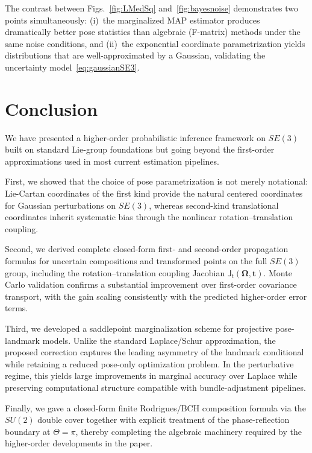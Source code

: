 \documentclass[journal]{IEEEtran}
\newcommand{\bfOmega}{\boldsymbol{\Omega}}
\begin{document}
The contrast between Figs.~\ref{fig:LMedSq} 
and~\ref{fig:bayesnoise} demonstrates two points simultaneously:
(i)~the marginalized MAP estimator produces dramatically better 
pose statistics than algebraic (F-matrix) methods under the 
same noise conditions, and (ii)~the exponential coordinate 
parametrization yields distributions that are well-approximated 
by a Gaussian, validating the uncertainty 
model~\eqref{eq:gaussianSE3}.
 
\section{Conclusion}
\label{sec:conclusion}
 
We have presented a higher-order probabilistic inference
framework on $SE(3)$ built on standard Lie-group
foundations but going beyond the first-order approximations
used in most current estimation pipelines.
 
First, we showed that the choice of pose parametrization is
not merely notational: Lie-Cartan coordinates of the first kind
provide the natural centered coordinates for Gaussian
perturbations on $SE(3)$, whereas second-kind translational
coordinates inherit systematic bias through the nonlinear
rotation--translation coupling.
 
Second, we derived complete closed-form first- and
second-order propagation formulas for uncertain compositions
and transformed points on the full $SE(3)$ group, including
the rotation--translation coupling Jacobian
$\mathsf{J}_t(\bfOmega,\mathbf{t})$. Monte Carlo validation
confirms a substantial improvement over first-order covariance
transport, with the gain scaling consistently with the predicted
higher-order error terms.
 
Third, we developed a saddlepoint marginalization scheme for
projective pose-landmark models. Unlike the standard
Laplace/Schur approximation, the proposed correction captures
the leading asymmetry of the landmark conditional while
retaining a reduced pose-only optimization problem. In the
perturbative regime, this yields large improvements in marginal
accuracy over Laplace while preserving computational
structure compatible with bundle-adjustment pipelines.
 
Finally, we gave a closed-form finite Rodrigues/BCH
composition formula via the $SU(2)$ double cover together
with explicit treatment of the phase-reflection boundary at
$\Theta=\pi$, thereby completing the algebraic machinery
required by the higher-order developments in the paper.
 
\end{document}
